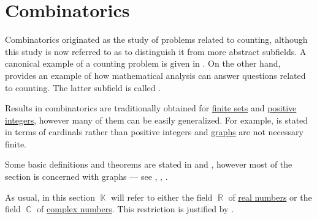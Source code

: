 \section{Combinatorics}\label{sec:combinatorics}

Combinatorics originated as the study of problems related to counting, although this study is now referred to as  to distinguish it from more abstract subfields. A canonical example of a counting problem is given in . On the other hand,  provides an example of how mathematical analysis can answer questions related to counting. The latter subfield is called .

Results in combinatorics are traditionally obtained for \hyperref[def:set_finiteness]{finite sets} and \hyperref[rem:peano_arithmetic_zero/positive]{positive integers}, however many of them can be easily generalized. For example,  is stated in terms of cardinals rather than positive integers and \hyperref[def:quiver/simple]{graphs} are not necessary finite.

Some basic definitions and theorems are stated in  and , however most of the section is concerned with graphs --- see , , .

As usual, in this section \( \BbbK \) will refer to either the field \( \BbbR \) of \hyperref[def:set_of_real_numbers]{real numbers} or the field \( \BbbC \) of \hyperref[def:set_of_real_numbers]{complex numbers}. This restriction is justified by .

